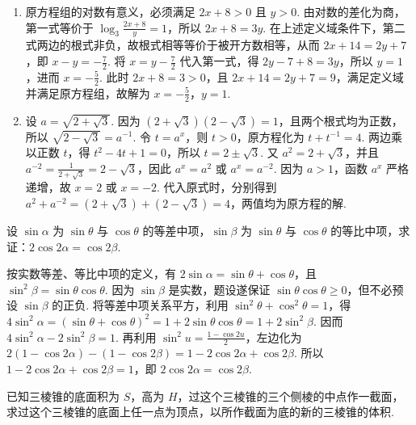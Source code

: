 \begin{solution}
\begin{enumerate}
\item 原方程组的对数有意义，必须满足 \(2x+8>0\) 且 \(y>0\). 由对数的差化为商，第一式等价于 \(\log_{3}\frac{2x+8}{y}=1\)，所以 \(2x+8=3y\). 在上述定义域条件下，第二式两边的根式非负，故根式相等等价于被开方数相等，从而 \(2x+14=2y+7\)，即 \(x-y=-\frac{7}{2}\). 将 \(x=y-\frac{7}{2}\) 代入第一式，得 \(2y-7+8=3y\)，所以 \(y=1\)，进而 \(x=-\frac{5}{2}\). 此时 \(2x+8=3>0\)，且 \(2x+14=2y+7=9\)，满足定义域并满足原方程组，故解为 \(x=-\frac{5}{2}\)，\(y=1\).
\item 设 \(a=\sqrt{2+\sqrt{3}}\). 因为 \(\left(2+\sqrt{3}\right)\left(2-\sqrt{3}\right)=1\)，且两个根式均为正数，所以 \(\sqrt{2-\sqrt{3}}=a^{-1}\). 令 \(t=a^{x}\)，则 \(t>0\)，原方程化为 \(t+t^{-1}=4\). 两边乘以正数 \(t\)，得 \(t^{2}-4t+1=0\)，所以 \(t=2\pm\sqrt{3}\). 又 \(a^{2}=2+\sqrt{3}\)，并且 \(a^{-2}=\frac{1}{2+\sqrt{3}}=2-\sqrt{3}\)，因此 \(a^{x}=a^{2}\) 或 \(a^{x}=a^{-2}\). 因为 \(a>1\)，函数 \(a^{x}\) 严格递增，故 \(x=2\) 或 \(x=-2\). 代入原式时，分别得到 \(a^{2}+a^{-2}=\left(2+\sqrt{3}\right)+\left(2-\sqrt{3}\right)=4\)，两值均为原方程的解.
\end{enumerate}
\end{solution}

\begin{problem}
设 \(\sin\alpha\) 为 \(\sin\theta\) 与 \(\cos\theta\) 的等差中项，\(\sin\beta\) 为 \(\sin\theta\) 与 \(\cos\theta\) 的等比中项，求证：\(2\cos2\alpha=\cos2\beta\).
\end{problem}

\begin{solution}
按实数等差、等比中项的定义，有 \(2\sin\alpha=\sin\theta+\cos\theta\)，且 \(\sin^{2}\beta=\sin\theta\cos\theta\). 因为 \(\sin\beta\) 是实数，题设遂保证 \(\sin\theta\cos\theta\geq0\)，但不必预设 \(\sin\beta\) 的正负. 将等差中项关系平方，利用 \(\sin^{2}\theta+\cos^{2}\theta=1\)，得 \(4\sin^{2}\alpha=\left(\sin\theta+\cos\theta\right)^{2}=1+2\sin\theta\cos\theta=1+2\sin^{2}\beta\). 因而 \(4\sin^{2}\alpha-2\sin^{2}\beta=1\). 再利用 \(\sin^{2}u=\frac{1-\cos2u}{2}\)，左边化为 \(2\left(1-\cos2\alpha\right)-\left(1-\cos2\beta\right)=1-2\cos2\alpha+\cos2\beta\). 所以 \(1-2\cos2\alpha+\cos2\beta=1\)，即 \(2\cos2\alpha=\cos2\beta\).
\end{solution}

\begin{problem}
已知三棱锥的底面积为 \(S\)，高为 \(H\)，过这个三棱锥的三个侧棱的中点作一截面，求过这个三棱锥的底面上任一点为顶点，以所作截面为底的新的三棱锥的体积.
\end{problem}

